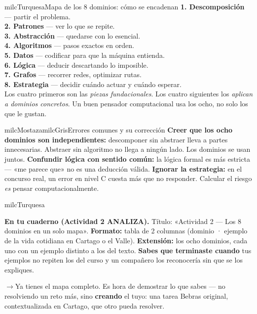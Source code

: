 \documentclass[11pt,letterpaper]{article}
\newcommand{\puente}[1]{%
  \begin{puentebox}%
    \textcolor{milcGradeDark}{$\rightarrow$}\hspace{2mm}#1%
  \end{puentebox}%
}
\begin{document}
\begin{drawbox}{milcTurquesa}{Mapa de los 8 dominios: cómo se encadenan}
\textbf{1. Descomposición} --- partir el problema. \\[1mm] \textbf{2. Patrones} --- ver lo que se repite. \\[1mm] \textbf{3. Abstracción} --- quedarse con lo esencial. \\[1mm] \textbf{4. Algoritmos} --- pasos exactos en orden. \\[1mm] \textbf{5. Datos} --- codificar para que la máquina entienda. \\[1mm] \textbf{6. Lógica} --- deducir descartando lo imposible. \\[1mm] \textbf{7. Grafos} --- recorrer redes, optimizar rutas. \\[1mm] \textbf{8. Estrategia} --- decidir cuándo actuar y cuándo esperar. \\[2mm] Los cuatro primeros son las \emph{piezas fundacionales}. Los cuatro siguientes los \emph{aplican a dominios concretos}. Un buen pensador computacional usa los ocho, no solo los que le gustan.
\end{drawbox}

\begin{softbox}{milcMostaza}{milcGris}{Errores comunes y su corrección}
\textbf{Creer que los ocho dominios son independientes:} descomponer sin abstraer lleva a partes innecesarias. Abstraer sin algoritmo no llega a ningún lado. Los dominios se usan juntos. \textbf{Confundir lógica con sentido común:} la lógica formal es más estricta --- «me parece que» no es una deducción válida. \textbf{Ignorar la estrategia:} en el concurso real, un error en nivel C cuesta más que no responder. Calcular el riesgo \emph{es} pensar computacionalmente.
\end{softbox}

\begin{infoband}{milcTurquesa}


\textbf{En tu cuaderno (Actividad 2 \textbullet{} ANALIZA).} Título: «Actividad 2 --- Los 8 dominios en un solo mapa». \textbf{Formato:} tabla de 2 columnas (dominio · ejemplo de la vida cotidiana en Cartago o el Valle). \textbf{Extensión:} los ocho dominios, cada uno con un ejemplo distinto a los del texto. \textbf{Sabes que terminaste cuando} tus ejemplos no repiten los del curso y un compañero los reconocería sin que se los expliques.
\end{infoband}

\puente{Ya tienes el mapa completo. Es hora de demostrar lo que sabes --- no resolviendo un reto más, sino \textbf{creando} el tuyo: una tarea Bebras original, contextualizada en Cartago, que otro pueda resolver.}
\end{document}
